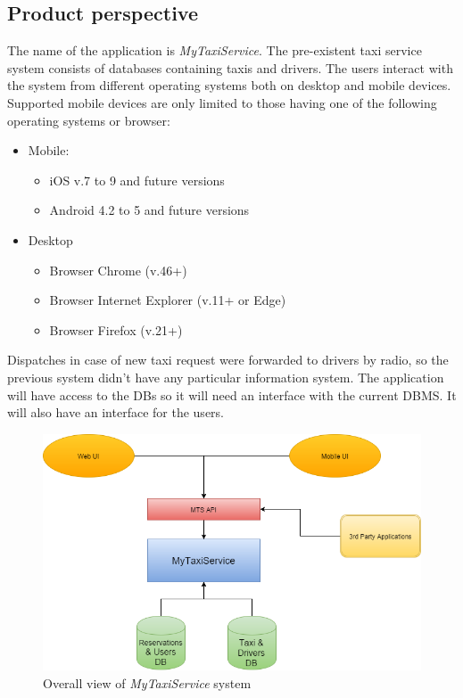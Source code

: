 \documentclass{article}
\begin{document}
\subsection{Product perspective}
The name of the application is \textit{MyTaxiService}.
The pre-existent taxi service system consists of databases containing taxis and drivers.
The users interact with the system from different operating systems both on desktop and mobile devices.
Supported mobile devices are only limited to those having one of the following operating systems or browser:
\begin{itemize}
\item Mobile:
\begin{itemize}
\item iOS v.7 to 9 and future versions
\item Android 4.2 to 5 and future versions
\end{itemize}
\item Desktop
\begin{itemize}
\item Browser Chrome (v.46+)
\item Browser Internet Explorer (v.11+ or Edge)
\item Browser Firefox (v.21+)
\end{itemize}
\end{itemize}
Dispatches in case of new taxi request were forwarded to drivers by radio, so the previous system didn't have any particular information system.
The application will have access to the DBs so it will need an interface with the current DBMS.
It will also have an interface for the users.


\begin{figure}[h!]
\begin{center}
\includegraphics[width=0.84\columnwidth]{Blocchi Diagram (1)/Blocchi Diagram (1)}
\caption{Overall view of \textit{MyTaxiService} system}
\end{center}
\end{figure}
\end{document}
